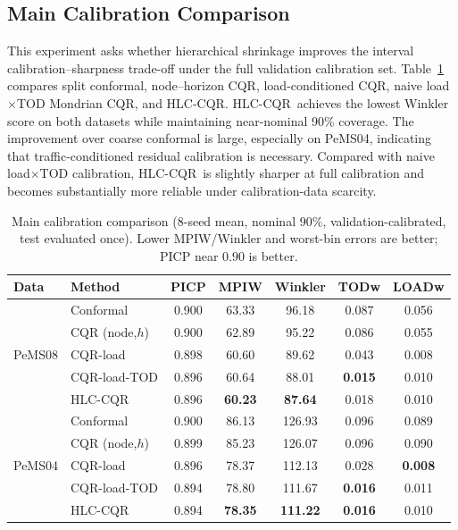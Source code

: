 \documentclass[letterpaper,journal]{IEEEtran}
\newcommand{\hlc}{HLC-CQR}
\begin{document}
\subsection{Main Calibration Comparison}
This experiment asks whether hierarchical shrinkage improves the interval calibration--sharpness trade-off under the full validation calibration set. Table~\ref{tab:hlc_main} compares split conformal, node--horizon CQR, load-conditioned CQR, naive load$\times$TOD Mondrian CQR, and \hlc. \hlc\ achieves the lowest Winkler score on both datasets while maintaining near-nominal 90\% coverage. The improvement over coarse conformal is large, especially on PeMS04, indicating that traffic-conditioned residual calibration is necessary. Compared with naive load$\times$TOD calibration, \hlc\ is slightly sharper at full calibration and becomes substantially more reliable under calibration-data scarcity.

\begin{table}[t]
\centering
\caption{Main calibration comparison (8-seed mean, nominal $90\%$, validation-calibrated, test evaluated once). Lower MPIW/Winkler and worst-bin errors are better; PICP near $0.90$ is better.}
\label{tab:hlc_main}
\footnotesize
\begin{tabular}{llccccc}
\toprule
Data & Method & PICP & MPIW & Winkler & TODw & LOADw \\
\midrule
\multirow{5}{*}{PeMS08}
 & Conformal      & 0.900 & 63.33 & 96.18 & 0.087 & 0.056 \\
 & CQR (node,$h$) & 0.900 & 62.89 & 95.22 & 0.086 & 0.055 \\
 & CQR-load       & 0.898 & 60.60 & 89.62 & 0.043 & 0.008 \\
 & CQR-load-TOD   & 0.896 & 60.64 & 88.01 & \textbf{0.015} & 0.010 \\
 & \hlc           & 0.896 & \textbf{60.23} & \textbf{87.64} & 0.018 & 0.010 \\
\midrule
\multirow{5}{*}{PeMS04}
 & Conformal      & 0.900 & 86.13 & 126.93 & 0.096 & 0.089 \\
 & CQR (node,$h$) & 0.899 & 85.23 & 126.07 & 0.096 & 0.090 \\
 & CQR-load       & 0.896 & 78.37 & 112.13 & 0.028 & \textbf{0.008} \\
 & CQR-load-TOD   & 0.894 & 78.80 & 111.67 & \textbf{0.016} & 0.011 \\
 & \hlc           & 0.894 & \textbf{78.35} & \textbf{111.22} & \textbf{0.016} & 0.010 \\
\bottomrule
\end{tabular}
\end{table}
\end{document}

